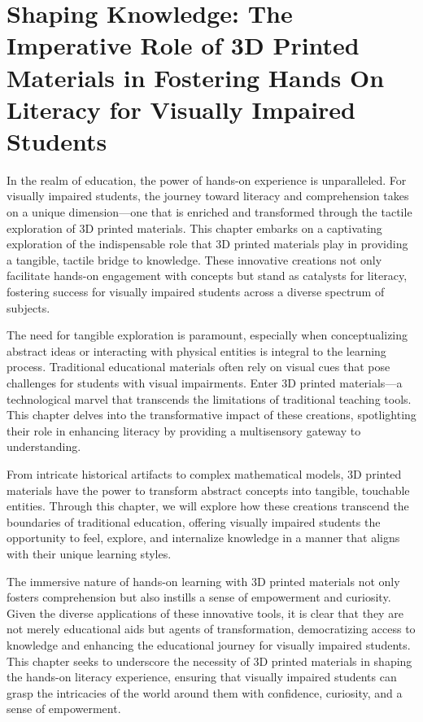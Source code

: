 \documentclass[12pt,letterpaper,twoside]{extreport}
\begin{document}
\cleardoublepage
\hypertarget{d-printers}{}\chapter[\raggedright Shaping Knowledge: \\The Imperative Role of 3D Printed Materials in Fostering Hands-On\\ Literacy for Visually Impaired Students]{Shaping Knowledge: The Imperative Role of 3D Printed Materials in Fostering Hands On Literacy for Visually Impaired Students}\label{d-printers}
\minitoc \newpage
In the realm of education, the power of hands-on experience is unparalleled. For visually impaired students, the journey toward literacy and comprehension takes on a unique dimension—one that is enriched and transformed through the tactile exploration of 3D printed materials. This chapter embarks on a captivating exploration of the indispensable role that 3D printed materials play in providing a tangible, tactile bridge to knowledge. These innovative creations not only facilitate hands-on engagement with concepts but stand as catalysts for literacy, fostering success for visually impaired students across a diverse spectrum of subjects.

The need for tangible exploration is paramount, especially when conceptualizing abstract ideas or interacting with physical entities is integral to the learning process. Traditional educational materials often rely on visual cues that pose challenges for students with visual impairments. Enter 3D printed materials—a technological marvel that transcends the limitations of traditional teaching tools. This chapter delves into the transformative impact of these creations, spotlighting their role in enhancing literacy by providing a multisensory gateway to understanding.

From intricate historical artifacts to complex mathematical models, 3D printed materials have the power to transform abstract concepts into tangible, touchable entities. Through this chapter, we will explore how these creations transcend the boundaries of traditional education, offering visually impaired students the opportunity to feel, explore, and internalize knowledge in a manner that aligns with their unique learning styles.

The immersive nature of hands-on learning with 3D printed materials not only fosters comprehension but also instills a sense of empowerment and curiosity. Given the diverse applications of these innovative tools, it is clear that they are not merely educational aids but agents of transformation, democratizing access to knowledge and enhancing the educational journey for visually impaired students. This chapter seeks to underscore the necessity of 3D printed materials in shaping the hands-on literacy experience, ensuring that visually impaired students can grasp the intricacies of the world around them with confidence, curiosity, and a sense of empowerment. 
\end{document}
